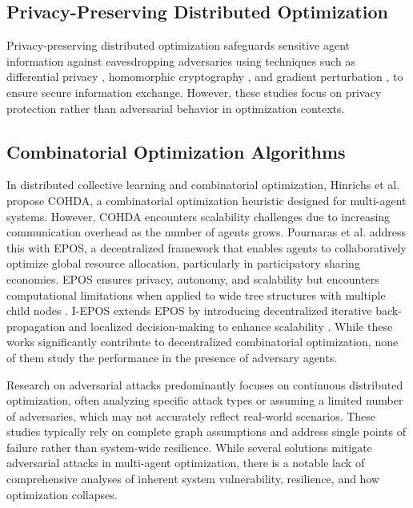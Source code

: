 \documentclass[journal]{IEEEtran}
\begin{document}
\subsection{Privacy-Preserving Distributed Optimization}
Privacy-preserving distributed optimization safeguards sensitive agent information against eavesdropping adversaries using techniques such as differential privacy \cite{ding2018consensus, ding2021differentially}, homomorphic cryptography \cite{zhang2018enabling, lu2018privacy}, and gradient perturbation \cite{mao2020privacy, chen2023differentially}, to ensure secure information exchange. However, these studies focus on privacy protection rather than adversarial behavior in optimization contexts.

\subsection{Combinatorial Optimization Algorithms}
In distributed collective learning and combinatorial optimization, Hinrichs et al. \cite{hinrichs2014cohda, hinrichs2017distributed} propose COHDA, a combinatorial optimization heuristic designed for multi-agent systems. However, COHDA encounters scalability challenges due to increasing communication overhead as the number of agents grows. Pournaras et al. \cite{pournaras2017self} address this with EPOS,
a decentralized framework that enables agents to collaboratively optimize global resource allocation, particularly in participatory sharing economies. EPOS ensures privacy, autonomy, and scalability but encounters computational limitations when applied to wide tree structures with multiple child nodes \cite{pournaras2018decentralized}. I-EPOS extends EPOS by introducing decentralized iterative back-propagation and localized decision-making to enhance scalability \cite{pournaras2020collective, pournaras2018decentralized}. While these works significantly contribute to decentralized combinatorial optimization, none of them study the performance in the presence of adversary agents.

Research on adversarial attacks predominantly focuses on continuous distributed optimization, often analyzing specific attack types or assuming a limited number of adversaries, which may not accurately reflect real-world scenarios. These studies typically rely on complete graph assumptions and address single points of failure rather than system-wide resilience. While several solutions mitigate adversarial attacks in multi-agent optimization, there is a notable lack of comprehensive analyses of inherent system vulnerability, resilience, and how optimization collapses.
\end{document}

